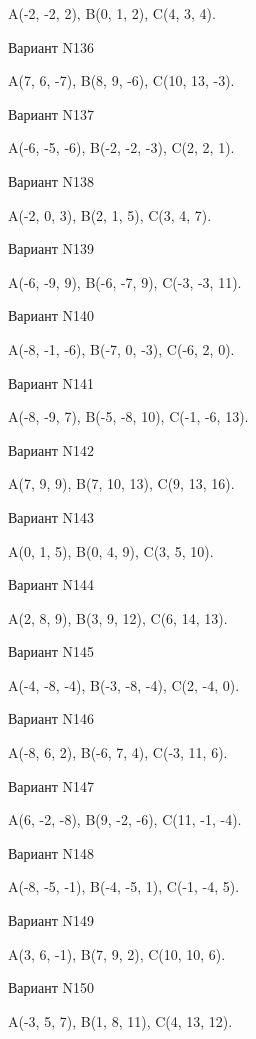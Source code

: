 \documentclass[11pt]{report}
\begin{document}
A(-2, -2, 2), B(0, 1, 2), C(4, 3, 4).

Вариант N136

A(7, 6, -7), B(8, 9, -6), C(10, 13, -3).

Вариант N137

A(-6, -5, -6), B(-2, -2, -3), C(2, 2, 1).

Вариант N138

A(-2, 0, 3), B(2, 1, 5), C(3, 4, 7).

Вариант N139

A(-6, -9, 9), B(-6, -7, 9), C(-3, -3, 11).

Вариант N140

A(-8, -1, -6), B(-7, 0, -3), C(-6, 2, 0).

Вариант N141

A(-8, -9, 7), B(-5, -8, 10), C(-1, -6, 13).

Вариант N142

A(7, 9, 9), B(7, 10, 13), C(9, 13, 16).

Вариант N143

A(0, 1, 5), B(0, 4, 9), C(3, 5, 10).

Вариант N144

A(2, 8, 9), B(3, 9, 12), C(6, 14, 13).

Вариант N145

A(-4, -8, -4), B(-3, -8, -4), C(2, -4, 0).

Вариант N146

A(-8, 6, 2), B(-6, 7, 4), C(-3, 11, 6).

Вариант N147

A(6, -2, -8), B(9, -2, -6), C(11, -1, -4).

Вариант N148

A(-8, -5, -1), B(-4, -5, 1), C(-1, -4, 5).

Вариант N149

A(3, 6, -1), B(7, 9, 2), C(10, 10, 6).

Вариант N150

A(-3, 5, 7), B(1, 8, 11), C(4, 13, 12).
\end{document}
